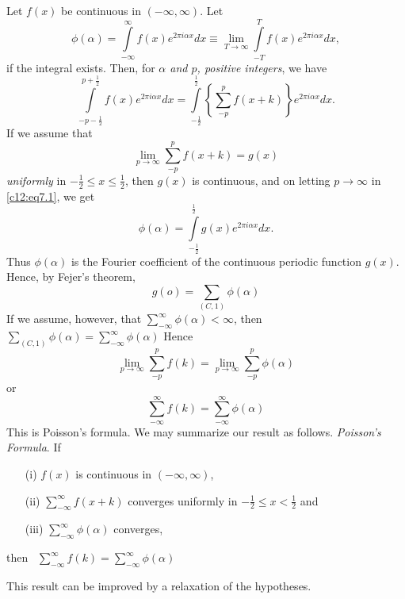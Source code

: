 Let $f(x)$ be continuous in $(-\infty, \infty)$. Let
$$
\phi(\alpha) = \int\limits^\infty_{-\infty} f(x) e^{2 \pi i \alpha x}
dx \equiv \lim\limits_{T \to \infty} \int\limits^T_{-T} f(x) e^{2\pi i
\alpha x} dx,
$$
if the integral exists. Then, for \textit{$\alpha$ and $p$, positive
  integers}, we have
\begin{equation}
\int\limits^{p+\frac{1}{2}}_{-p-\frac{1}{2}} f(x) e^{2\pi i \alpha
  x}dx = \int\limits^{\frac{1}{2}}_{-\frac{1}{2}}
\left\{\sum\limits^p_{-p} f (x+k) \right\} e^{2\pi i \alpha x}dx.\label{c12:eq7.1}
\end{equation}
If we assume that 
\begin{equation*}
\lim\limits_{p\to\infty} \sum\limits^p_{-p} f(x+k) = g(x)
\end{equation*}
\textit{uniformly} in $-\frac{1}{2} \leq x \leq \frac{1}{2}$, then
$g(x)$ is continuous, and on letting $p\to \infty$ in \eqref{c12:eq7.1}, we get
$$
\phi (\alpha) = \int\limits^{\frac{1}{2}}_{-\frac{1}{2}} g(x) e^{2\pi
  i \alpha x} dx.
$$
Thus $\phi(\alpha)$ is the Fourier coefficient of the continuous
periodic function $g(x)$. Hence, by Fejer's theorem,
$$
g(o) = \sum\limits_{(C,1)} \phi (\alpha)
$$
If we assume, however, that $\sum\limits^\infty_{-\infty} \phi (\alpha)
< \infty$, then $\sum\limits_{(C,1)} \phi (\alpha) =
\sum\limits^\infty_{-\infty} \phi (\alpha)$ 
Hence
$$
\lim\limits_{p\to \infty} \sum\limits^p_{-p} f(k) =
\lim\limits_{p\to\infty} \sum\limits^p_{-p} \phi (\alpha)
$$
or\pageoriginale
\begin{equation}
\sum\limits^\infty_{-\infty} f(k) = \sum\limits^\infty_{-\infty} \phi
(\alpha)\label{c12:eq7.2}
\end{equation}
This is Poisson's formula. We may summarize our result as
follows. \textit{Poisson's Formula}. If
\begin{itemize}
\item[{\rm(i)}] $f(x)$ is continuous in $(-\infty, \infty)$,

\item[{\rm(ii)}] $\sum\limits^\infty_{-\infty} f(x+k)$ converges
  uniformly in $-\frac{1}{2} \leq x < \frac{1}{2}$ and 

\item[{\rm(iii)}] $\sum\limits^\infty_{-\infty} \phi (\alpha)$ converges,
\end{itemize}
then \  
$
\sum\limits^\infty_{-\infty} f(k) = \sum\limits^\infty_{-\infty} \phi
(\alpha) 
$

\begin{remarks*}
This result can be improved by a relaxation of the hypotheses.
\end{remarks*}



